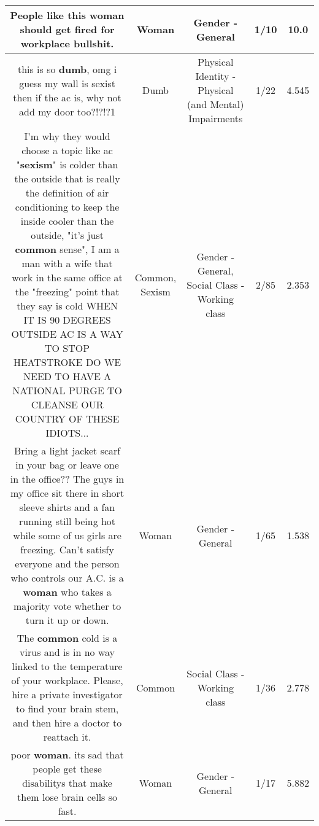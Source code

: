 \documentclass[11pt]{article}
\newlength\mylength
\begin{document}
\begin{center}
\begin{longtable}{|C{.65\mylength}|C{.30\mylength}|C{.12\mylength}|C{.12\mylength}|C{.12\mylength}|}
  \small People like this \textbf{woman} should get fired for workplace bullshit.\normalsize   & Woman & Gender - General & 1/10 & 10.0 \\  \hline
  \small this is so \textbf{dumb}, omg i guess my wall is sexist then if the ac is, why not add my door too?!?!?1\normalsize   & Dumb & Physical Identity - Physical (and Mental) Impairments & 1/22 & 4.545 \\  \hline
  \small I'm why they would choose a topic like ac "\textbf{sexism}" is colder than the outside that is really the definition of air conditioning to keep the inside cooler than the outside, "it's just \textbf{common} sense", I am a man with a wife that work in the same office at the "freezing" point that they say is cold WHEN IT IS 90 DEGREES OUTSIDE AC IS A WAY TO STOP HEATSTROKE DO WE NEED TO HAVE A NATIONAL PURGE TO CLEANSE OUR COUNTRY OF THESE IDIOTS...\normalsize   & Common, Sexism & Gender - General, Social Class - Working class & 2/85 & 2.353 \\  \hline
  \small Bring a light jacket  scarf in your bag or leave one in the office?? The guys in my office sit there in short sleeve shirts and a fan running still being hot while some of us girls are freezing. Can't satisfy everyone and the person who controls our A.C. is a \textbf{woman} who takes a majority vote whether to turn it up or down.\normalsize   & Woman & Gender - General & 1/65 & 1.538 \\  \hline
  \small The \textbf{common} cold is a virus and is in no way linked to the temperature of your workplace. Please, hire a private investigator to find your brain stem, and then hire a doctor to reattach it.\normalsize   & Common & Social Class - Working class & 1/36 & 2.778 \\  \hline
  \small poor \textbf{woman}. its sad that people get these disabilitys that make them lose brain cells so fast.\normalsize   & Woman & Gender - General & 1/17 & 5.882 \\  \hline

\end{longtable}
\end{center}
\end{document}
